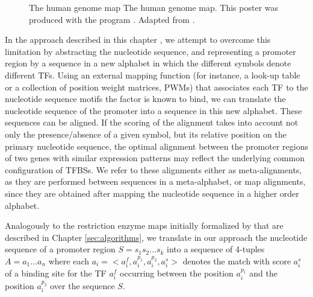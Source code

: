 \begin{figure}[t!]
\begin{center}
\setlength{\fboxsep}{0pt}
          {The human genome map}%
          {The human genome map.}%
          {This poster was produced with the program  \citep{abril:2000a}. 
           Adapted from \citet{venter:2001a}.}
\end{center}
\end{figure}

In the approach described in this chapter \citep{blanco:2006b}, 
we attempt to overcome this limitation
by abstracting the nucleotide sequence, and representing a promoter
region by a sequence in a new alphabet in which the different symbols
denote different TFs. Using an external mapping function (for instance, 
a look-up table or a collection of position weight matrices, PWMs) that 
associates each TF to the nucleotide sequence motifs the factor is
known to bind, we can translate the nucleotide sequence of the
promoter into a sequence in this new alphabet. These sequences 
can be aligned. If the scoring of the
alignment takes into account not only the presence/absence of a given
symbol, but its relative position on the primary nucleotide sequence,
the optimal alignment between the promoter regions of two 
genes with similar expression patterns 
may reflect the underlying common configuration of
TFBSs.  We refer to these alignments either as meta-alignments, 
as they are performed between sequences in a meta-alphabet, or map
alignments, since they are obtained after mapping the nucleotide
sequence in a higher order alphabet.

\label{sec:tfmaps}

Analogously to the restriction enzyme maps initially formalized by 
\citet{waterman:1984c} that are described in Chapter \ref{sec:algorithms},
we translate in our approach \citep{blanco:2006b} the nucleotide sequence 
of a promoter region $S = s_1 s_2 \ldots s_k$  into a sequence of 4-tuples
$A = a_1 \ldots a_n$ where each $a_i = <a_i^f,a_i^{p_1},a_i^{p_2},a_i^s>$
denotes the match with score $a_i^s$ of a binding site for the TF
$a_i^f$  occurring between the position $a_i^{p_1}$ and the position
$a_i^{p_2}$ over the sequence $S$. 

